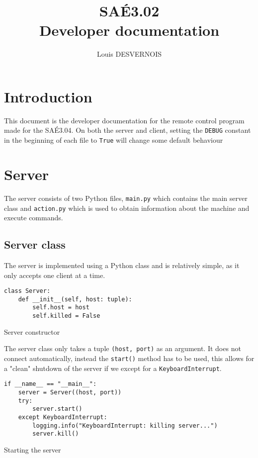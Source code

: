 \documentclass{article}
\author{Louis DESVERNOIS}
\title{%
    SAÉ3.02 \\
    \large Developer documentation}
\begin{document}
\maketitle
\tableofcontents
\listoffigures
\listoflistings

\newpage
\section{Introduction}
This document is the developer documentation for the remote control program made
for the SAÉ3.04. On both the server and client, setting the \verb|DEBUG|
constant in the beginning of each file to \verb|True| will change some default behaviour 

\section{Server}
The server consists of two Python files, \verb|main.py| which contains the main
server class and \verb|action.py| which is used to obtain information about the
machine and execute commands.

\subsection{Server class}
The server is implemented using a Python class and is relatively simple, as it
only accepts one client at a time.

\begin{listing}[H]
    \begin{verbatim}
class Server:
    def __init__(self, host: tuple):
        self.host = host
        self.killed = False
    \end{verbatim}
    \caption{Server constructor}
    \label{serv:init}
\end{listing}

The server class only takes a tuple \verb|(host, port)| as an argument. It does
not connect automatically, instead the \verb|start()| method has to be used,
this allows for a "clean" shutdown of the server if we except for a
\verb|KeyboardInterrupt|.

\begin{listing}[H]
    \begin{verbatim}
if __name__ == "__main__":
    server = Server((host, port))
    try:
        server.start()
    except KeyboardInterrupt:
        logging.info("KeyboardInterrupt: killing server...")
        server.kill()
    \end{verbatim}
    \caption{Starting the server}
    \label{serv:start}
\end{listing}
\end{document}
